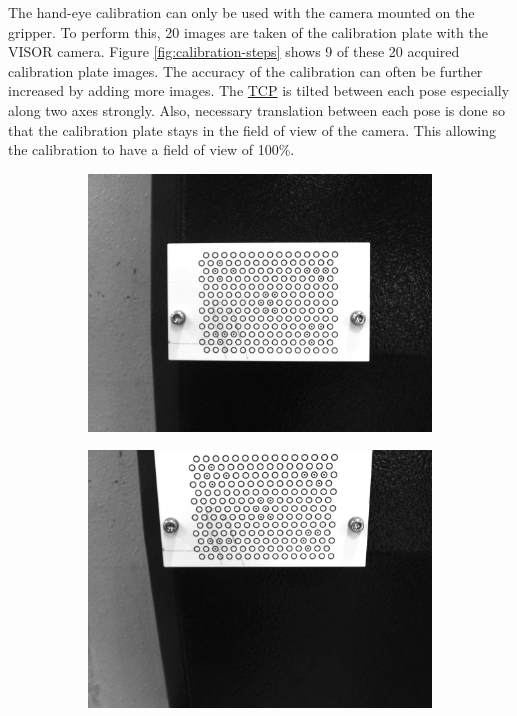 The hand-eye calibration can only be used with the camera
mounted on the gripper. To perform this, 20 images are taken of the calibration plate with the
VISOR camera. Figure \ref{fig:calibration-steps}  shows 9 of these 20 acquired calibration plate images. The accuracy of the calibration can often be further increased by adding more images. The \hyperref[acro:TCP]{TCP} is tilted between each pose especially along two axes strongly. Also, necessary translation between each pose is done so that the calibration plate stays in the field of view of the camera. This allowing the calibration to have a field of view of 100\%.



\begin{figure}[h]
    \centering
    \begin{subfigure}{0.32\textwidth}
        \centering
        \includegraphics[width=\textwidth]{figures/001calibration/calibration.png}
    \end{subfigure}\hspace{0cm}
    \begin{subfigure}{0.32\textwidth}
        \centering
        \includegraphics[width=\textwidth]{figures/001calibration/calibration1.png}

\end{subfigure}
\end{figure}

